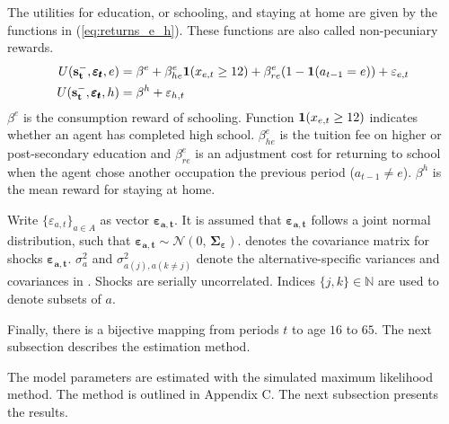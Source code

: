 The utilities for education, or schooling, and staying at home are given by the functions in (\ref{eq:returns_e_h}). These functions are also called non-pecuniary rewards.
\begin{equation} \label{eq:returns_e_h}
\begin{aligned}
U(\bold{s_t^-}, \pmb{\varepsilon_t},e) &= \beta^e + \beta_{he}^e \bold 1(x_{e,t} \geq 12) + \beta_{re}^e(1-\bold1(a_{t-1}=e)) + \varepsilon_{e,t} \\
U(\bold{s_t^-},\pmb{\varepsilon_t},h) &= \beta^h + \varepsilon_{h,t} \\
\end{aligned}
\end{equation}
\noindent
$\beta^e$ is the consumption reward of schooling. Function $\bold 1(x_{e,t} \geq 12)$ indicates whether an agent has completed high school. $\beta_{he}^e$ is the tuition fee on higher or post-secondary education and $\beta_{re}^e$ is an adjustment cost for returning to school when the agent chose another occupation the previous period ($a_{t-1}\neq e$). $\beta^h$ is the mean reward for staying at home.

Write $\{\varepsilon_{a,t}\}_{a \in A}$ as vector $\pmb{\varepsilon_{a,t}}$. It is assumed that $\pmb{\varepsilon_{a,t}}$ follows a joint normal distribution, such that $\pmb{\varepsilon_{a,t}} \sim \mathcal{N}(0,\,\pmb{\Sigma_\varepsilon})$. \pmb{$\Sigma_\varepsilon$} denotes the covariance matrix for shocks $\pmb{\varepsilon_{a,t}}$. $\sigma_a^{2}$ and $\sigma^{2}_{a(j),a(k\neq j)}$ denote the alternative-specific variances and covariances in \pmb{$\Sigma_\varepsilon$}. Shocks are serially uncorrelated. Indices $\{j,k\} \in \mathbb{N}$ are used to denote subsets of $a$.

Finally, there is a bijective mapping from periods $t$ to age $16$ to $65$. The next subsection describes the estimation method.

The model parameters are estimated with the simulated maximum likelihood method. The method is outlined in Appendix C. The next subsection presents the results.

